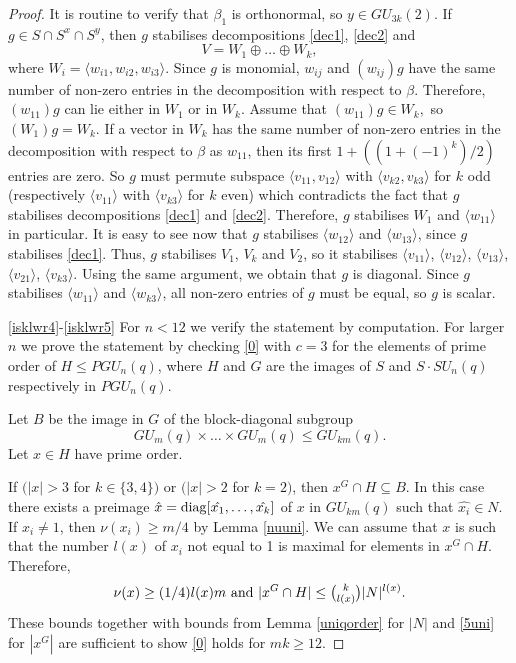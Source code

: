 \begin{proof}
It is routine to verify that $\beta_1$ is orthonormal, so $y \in GU_{3k}(2)$. If $g \in S \cap S^x \cap S^y$, then $g$ stabilises decompositions \eqref{dec1}, \eqref{dec2} and 
\begin{equation*}
V=W_1 \oplus \ldots \oplus W_k,
\end{equation*}
where $W_i=\langle w_{i1}, w_{i2}, w_{i3} \rangle.$ Since $g$ is monomial, $w_{ij}$ and $(w_{ij})g$ have the same number of non-zero entries in the decomposition with respect to $\beta.$ Therefore, $(w_{11})g$ can lie either in $W_1$ or in $W_k.$ Assume that $(w_{11})g \in W_k,$ so $(W_1)g=W_k.$ If a vector in $W_k$ has the same number of non-zero entries  in the decomposition with respect to $\beta$ as $w_{11}$, then its first $1+((1+(-1)^k)/2)$ entries are zero. So $g$ must permute subspace $\langle v_{11}, v_{12} \rangle$ with $\langle v_{k2}, v_{k3} \rangle$ for $k$ odd (respectively $\langle v_{11} \rangle$ with $\langle v_{k3} \rangle$ for $k$ even) which contradicts the fact that $g$ stabilises decompositions \eqref{dec1} and \eqref{dec2}. Therefore, $g$ stabilises $W_1$ and $\langle w_{11} \rangle$ in particular. It is easy to see now that $g$ stabilises  $\langle w_{12} \rangle$ and $\langle w_{13} \rangle$, since $g$ stabilises \eqref{dec1}. Thus, $g$ stabilises $V_1$, $V_k$ and $V_2$, so it stabilises  $\langle v_{11} \rangle$,
$\langle v_{12} \rangle$, $\langle v_{13} \rangle$, $\langle v_{21} \rangle$, $\langle v_{k3} \rangle$. Using the same argument, we obtain that $g$ is diagonal. Since $g$ stabilises $\langle w_{11} \rangle$ and $\langle w_{k3} \rangle$, all non-zero entries of $g$ must be equal, so $g$ is scalar. 





\medskip

\eqref{isklwr4}-\eqref{isklwr5}  For  $n<12$ we verify the statement by computation. For larger $n$ we prove the statement by checking \eqref{0} with $c=3$ for the elements of prime order of $H \le PGU_n(q)$, where $H$ and $G$ are the images of $S$ and $S \cdot SU_n(q)$ respectively in $PGU_n(q).$  

 Let $B$ be the image in $G$ of the block-diagonal subgroup $$GU_m(q) \times \ldots \times GU_m(q) \le GU_{km}(q).$$ 
Let $x \in H$ have prime order.

 If  $(|x| > 3$ for $k \in \{3,4\})$ or $(|x| > 2$ for $k=2)$, then $x^G \cap H \subseteq B.$ 
In this case there exists a preimage $\hat{x}=\mathrm{diag}[\hat{x_1}, \ldots ,\hat{x_k}]$ of $x$ in $GU_{km}(q)$ such that $\hat{x_i} \in N.$  If $x_i\ne 1$, then $\nu(x_i)\ge m/4$ by Lemma \ref{nuuni}. We can assume that $x$ is such that the number $l(x)$ of $x_i$ not equal to 1 is maximal for elements in $x^G \cap H.$ Therefore, 
$$\nu(x) \ge (1/4)l(x)m \text{ and } |x^G \cap H| \le \tbinom{k}{l(x)} |N|^{l(x)}.$$
These bounds together with bounds from Lemma \ref{uniqorder} for $|N|$ and \eqref{5uni} for $|x^G|$ are  sufficient to show \eqref{0} holds for $mk \ge 12.$


\end{proof}
